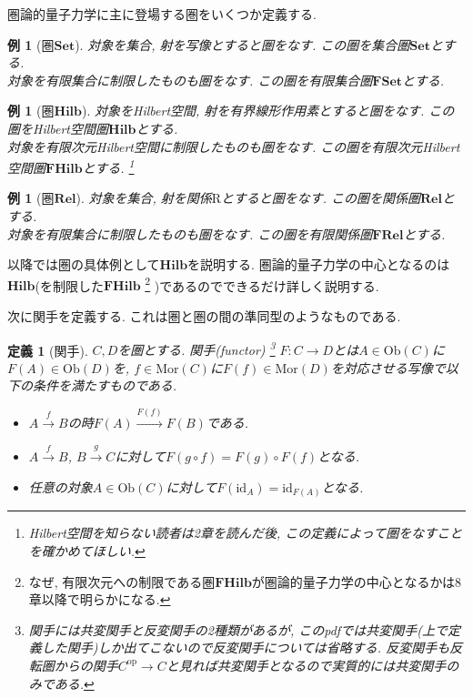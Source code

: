 \documentclass[a4paper,12pt]{ltjsarticle}
\theoremstyle{break}
\newtheorem{defn}[thm]{定義}
\newtheorem{eg}[thm]{例}
\newcommand{\cset}{\mathbf{Set}}
\newcommand{\fset}{\mathbf{FSet}}
\newcommand{\rel}{\mathbf{Rel}}
\newcommand{\frel}{\mathbf{FRel}}
\newcommand{\hilb}{\mathbf{Hilb}}
\newcommand{\fhilb}{\mathbf{FHilb}}
\newcommand{\mrr}{\mathrm{R}}
\newcommand{\Ob}{\mathrm{Ob}}
\newcommand{\Mor}{\mathrm{Mor}}
\newcommand{\Op}{\mathrm{op}}
\newcommand{\xr}[1]{\xrightarrow{#1}}
\newcommand{\id}{\mathrm{id}}
\numberwithin{equation}{section}
\begin{document}
圏論的量子力学に主に登場する圏をいくつか定義する. 

\begin{eg}[圏$\cset$]
  対象を集合, 射を写像とすると圏をなす. 
  この圏を集合圏$\cset$とする. \\
  対象を有限集合に制限したものも圏をなす. 
  この圏を有限集合圏$\fset$とする. 
\end{eg}  

\begin{eg}[圏$\hilb$]
  対象をHilbert空間, 射を有界線形作用素とすると圏をなす. 
  この圏をHilbert空間圏$\hilb$とする. \\
  対象を有限次元Hilbert空間に制限したものも圏をなす. 
  この圏を有限次元Hilbert空間圏$\fhilb$とする. 
  \footnote{
      Hilbert空間を知らない読者は2章を読んだ後, この定義によって圏をなすことを確かめてほしい.
    }
\end{eg} 

\begin{eg}[圏$\rel$]
  対象を集合, 射を関係$\mrr$とすると圏をなす. 
  この圏を関係圏$\rel$とする. \\
  対象を有限集合に制限したものも圏をなす. 
  この圏を有限関係圏$\frel$とする. 
\end{eg}  

以降では圏の具体例として$\hilb$を説明する.  
圏論的量子力学の中心となるのは$\hilb$(を制限した$\fhilb$
\footnote{
    なぜ, 有限次元への制限である圏$\fhilb$が圏論的量子力学の中心となるかは8章以降で明らかになる.
  }
  )であるのでできるだけ詳しく説明する. 

次に関手を定義する. 
これは圏と圏の間の準同型のようなものである. 

\begin{defn}[関手]
  $C, D$を圏とする. 
  関手(functor)
  \footnote{
    関手には共変関手と反変関手の2種類があるが, このpdfでは共変関手(上で定義した関手)しか出てこないので反変関手については省略する. 
    反変関手も反転圏からの関手$C^\Op \to C$と見れば共変関手となるので実質的には共変関手のみである.  
  }
  $F: C \to D$とは$A \in \Ob(C)$に$F(A) \in \Ob(D)$を, $f \in \Mor(C)$に$F(f) \in \Mor(D)$を対応させる写像で以下の条件を満たすものである. 
  \begin{itemize}
    \item $A \xr{f} B$の時$F(A) \xr{F(f)} F(B)$である. 
    \item $A \xr{f} B$, $B \xr{g} C$に対して$F(g \circ f) = F(g) \circ F(f)$となる.
    \item 任意の対象$A \in \Ob(C)$に対して$F(\id_A) = \id_{F(A)}$となる. 
  \end{itemize}
\end{defn}
\end{document}
